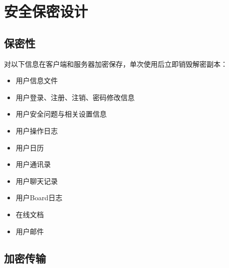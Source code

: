 \chapter{安全保密设计}
    \section{保密性}
    对以下信息在客户端和服务器加密保存，单次使用后立即销毁解密副本：
    \begin{itemize}
        \item 用户信息文件
        \item 用户登录、注册、注销、密码修改信息
        \item 用户安全问题与相关设置信息
        \item 用户操作日志
        \item 用户日历
        \item 用户通讯录
        \item 用户聊天记录
        \item 用户Board日志
        \item 在线文档
        \item 用户邮件
    \end{itemize}
    \section{加密传输}
